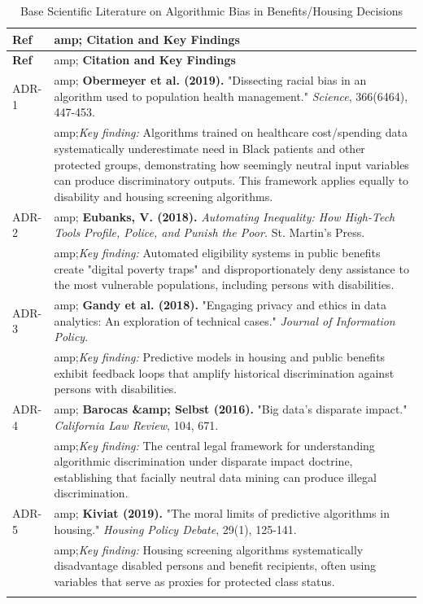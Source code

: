\documentclass[12pt,letterpaper]{article}
\begin{document}
\begin{singlespacing}
\begin{longtable}{p{0.5in}p{5.5in}}
\toprule
\textbf{Ref} &amp; \textbf{Citation and Key Findings} \\
\midrule
\endfirsthead
\toprule
\textbf{Ref} &amp; \textbf{Citation and Key Findings} \\
\midrule
\endhead
ADR-1 &amp;
\textbf{Obermeyer et al. (2019).} "Dissecting racial bias in an algorithm used to population health management." \textit{Science}, 366(6464), 447-453.\\
&amp;\textit{Key finding:} Algorithms trained on healthcare cost/spending data systematically underestimate need in Black patients and other protected groups, demonstrating how seemingly neutral input variables can produce discriminatory outputs. This framework applies equally to disability and housing screening algorithms.\\
\midrule
ADR-2 &amp;
\textbf{Eubanks, V. (2018).} \textit{Automating Inequality: How High-Tech Tools Profile, Police, and Punish the Poor.} St. Martin's Press.\\
&amp;\textit{Key finding:} Automated eligibility systems in public benefits create "digital poverty traps" and disproportionately deny assistance to the most vulnerable populations, including persons with disabilities.\\
\midrule
ADR-3 &amp;
\textbf{Gandy et al. (2018).} "Engaging privacy and ethics in data analytics: An exploration of technical cases." \textit{Journal of Information Policy}.\\
&amp;\textit{Key finding:} Predictive models in housing and public benefits exhibit feedback loops that amplify historical discrimination against persons with disabilities.\\
\midrule
ADR-4 &amp;
\textbf{Barocas \&amp; Selbst (2016).} "Big data's disparate impact." \textit{California Law Review}, 104, 671.\\
&amp;\textit{Key finding:} The central legal framework for understanding algorithmic discrimination under disparate impact doctrine, establishing that facially neutral data mining can produce illegal discrimination.\\
\midrule
ADR-5 &amp;
\textbf{Kiviat (2019).} "The moral limits of predictive algorithms in housing." \textit{Housing Policy Debate}, 29(1), 125-141.\\
&amp;\textit{Key finding:} Housing screening algorithms systematically disadvantage disabled persons and benefit recipients, often using variables that serve as proxies for protected class status.\\
\bottomrule
\caption{Base Scientific Literature on Algorithmic Bias in Benefits/Housing Decisions}
\end{longtable}


\end{singlespacing}
\end{document}
